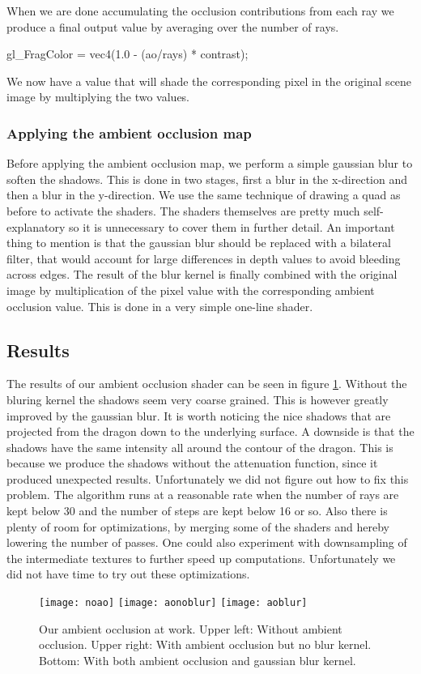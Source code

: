 When we are done accumulating the occlusion contributions from each
ray we produce a final output value by averaging over the number of
rays.
\begin{cppcode}
  gl_FragColor = vec4(1.0 - (ao/rays) * contrast);
\end{cppcode}
We now have a value that will shade the corresponding pixel in the
original scene image by multiplying the two values.

\subsubsection*{Applying the ambient occlusion map}
Before applying the ambient occlusion map, we perform a simple gaussian
blur to soften the shadows. This is done in two stages, first a blur
in the x-direction and then a blur in the y-direction. We use the same
technique of drawing a quad as before to activate the shaders. The
shaders themselves are pretty much self-explanatory so it is
unnecessary to cover them in further detail. An important thing to
mention is that the gaussian blur should be replaced with a bilateral
filter, that would account for large differences in depth values to
avoid bleeding across edges. The result of the blur kernel is finally
combined with the original image by multiplication of the pixel value
with the corresponding ambient occlusion value. This is done in a very
simple one-line shader.

\subsection{Results}

The results of our ambient occlusion shader can be seen in figure
\ref{fig:res}. Without the bluring kernel the shadows seem very coarse
grained. This is however greatly improved by the gaussian blur. It
is worth noticing the nice shadows that are projected from the dragon
down to the underlying surface. A downside is that the shadows have
the same intensity all around the contour of the dragon. This is
because we produce the shadows without the attenuation function, since
it produced unexpected results. Unfortunately we did not figure out
how to fix this problem. The algorithm runs at a reasonable rate when
the number of rays are kept below 30 and the number of steps are kept
below 16 or so. Also there is plenty of room for optimizations, by
merging some of the shaders and hereby lowering the number of
passes. One could also experiment with downsampling of the
intermediate textures to further speed up computations. Unfortunately
we did not have time to try out these optimizations.

\begin{figure}[h]
\label{fig:res}
  \centering
  \texttt{[image: noao]}
  \texttt{[image: aonoblur]}
  \texttt{[image: aoblur]}
  \caption{Our ambient occlusion at work. Upper left: Without ambient
    occlusion. Upper right: With ambient occlusion but no blur
    kernel. Bottom: With both ambient occlusion and gaussian blur kernel.}
\end{figure}


